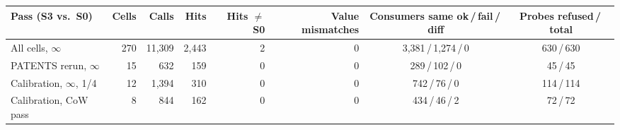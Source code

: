 \begin{tabular}{@{}lrrrrrcc@{}}
\toprule
Pass (S3 vs.\ S0) & Cells & Calls & Hits & Hits $\neq$ S0 & Value mismatches & Consumers same ok\,/\,fail\,/\,diff & Probes refused\,/\,total \\
\midrule
All cells, $\infty$ & 270 & 11,309 & 2,443 & 2 & 0 & 3,381\,/\,1,274\,/\,0 & 630\,/\,630 \\
PATENTS rerun, $\infty$ & 15 & 632 & 159 & 0 & 0 & 289\,/\,102\,/\,0 & 45\,/\,45 \\
Calibration, $\infty$, 1/4 & 12 & 1,394 & 310 & 0 & 0 & 742\,/\,76\,/\,0 & 114\,/\,114 \\
Calibration, CoW pass & 8 & 844 & 162 & 0 & 0 & 434\,/\,46\,/\,2 & 72\,/\,72 \\
\bottomrule
\end{tabular}
